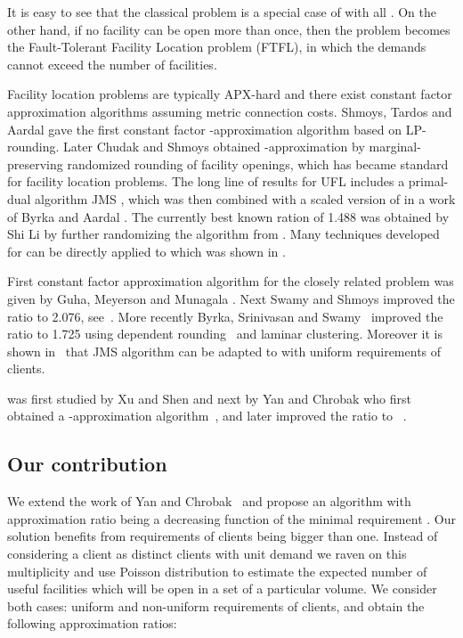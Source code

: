 \documentclass{llncs}
\begin{document}
It is easy to see that the classical  problem is a special case of  with all  . On the other hand, if no facility can be open more than once, then the problem becomes the Fault-Tolerant Facility Location problem (FTFL), in which the demands cannot exceed the number of facilities. 

Facility location problems are typically APX-hard and there exist constant factor approximation algorithms assuming metric connection costs. Shmoys, Tardos and Aardal \cite{Tardos} gave the first constant factor -approximation algorithm based on LP-rounding. Later Chudak and Shmoys \cite{Chudak} obtained -approximation by marginal-preserving randomized  rounding of facility openings, which has became standard for facility location problems. The long line of results for UFL includes a primal-dual algorithm JMS \cite{Jain}, which was then combined with a scaled version of \cite{Chudak} in a work of Byrka and Aardal \cite{Aardal}. The currently best known ration of 1.488 was obtained by Shi Li \cite{ShiLi} by further randomizing the algorithm from \cite{Aardal}. Many techniques developed for  can be directly applied to  which was shown in \cite{Yan}.

First constant factor approximation algorithm for the closely related  problem was given by Guha, Meyerson and Munagala \cite{Meyerson}. Next Swamy and Shmoys  improved the ratio to 2.076, see~\cite{Swamy}. More recently Byrka, Srinivasan and Swamy~\cite{ftfl_1725} improved the ratio to 1.725 using dependent rounding~\cite{Aravind} and laminar clustering. Moreover it is shown in~\cite{Swamy} that JMS algorithm can be adapted to  with uniform requirements of clients.

 was first studied by Xu and Shen \cite{Xu} and next by Yan and Chrobak who first obtained a -approximation algorithm~\cite{Yan_316}, and later improved the ratio to ~\cite{Yan}.

\subsection{Our contribution}

We extend the work of Yan and Chrobak~\cite{Yan} and propose an algorithm with approximation ratio being a decreasing function of the minimal requirement . Our solution benefits from requirements of clients being bigger than one. Instead of considering a client  as  distinct clients with unit demand we raven on this multiplicity and use Poisson distribution to estimate the expected number of useful facilities which will be open in a set of a particular volume. We consider both cases: uniform and non-uniform requirements of clients, and obtain the following approximation ratios: 
\end{document}
